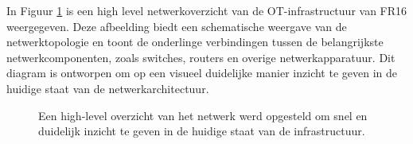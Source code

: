\vspace{5mm}
\begin{table}[h!]
    \centering
    \caption{Overzicht van het apparaat SW\_MAP\_UC\_MASTER binnen het OT-netwerk.}
    \label{fig:UCMASTER}
\end{table}

In Figuur \ref{fig:FR16_before} is een high level netwerkoverzicht van de OT-infrastructuur van FR16 weergegeven. Deze afbeelding biedt een schematische weergave van de netwerktopologie en toont de onderlinge verbindingen tussen de belangrijkste netwerkcomponenten, zoals switches, routers en overige netwerkapparatuur. Dit diagram is ontworpen om op een visueel duidelijke manier inzicht te geven in de huidige staat van de netwerkarchitectuur.

\begin{figure}[H]
    \centering
    \caption[high-level overzicht]{\label{fig:FR16_before}Een high-level overzicht van het netwerk werd opgesteld om snel en duidelijk inzicht te geven in de huidige staat van de infrastructuur.}
\end{figure}


